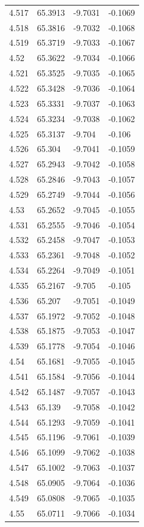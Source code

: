 \begin{tabular}{llll}
4.517 & 65.3913 & -9.7031 & -0.1069 \\
4.518 & 65.3816 & -9.7032 & -0.1068 \\
4.519 & 65.3719 & -9.7033 & -0.1067 \\
4.52 & 65.3622 & -9.7034 & -0.1066 \\
4.521 & 65.3525 & -9.7035 & -0.1065 \\
4.522 & 65.3428 & -9.7036 & -0.1064 \\
4.523 & 65.3331 & -9.7037 & -0.1063 \\
4.524 & 65.3234 & -9.7038 & -0.1062 \\
4.525 & 65.3137 & -9.704 & -0.106 \\
4.526 & 65.304 & -9.7041 & -0.1059 \\
4.527 & 65.2943 & -9.7042 & -0.1058 \\
4.528 & 65.2846 & -9.7043 & -0.1057 \\
4.529 & 65.2749 & -9.7044 & -0.1056 \\
4.53 & 65.2652 & -9.7045 & -0.1055 \\
4.531 & 65.2555 & -9.7046 & -0.1054 \\
4.532 & 65.2458 & -9.7047 & -0.1053 \\
4.533 & 65.2361 & -9.7048 & -0.1052 \\
4.534 & 65.2264 & -9.7049 & -0.1051 \\
4.535 & 65.2167 & -9.705 & -0.105 \\
4.536 & 65.207 & -9.7051 & -0.1049 \\
4.537 & 65.1972 & -9.7052 & -0.1048 \\
4.538 & 65.1875 & -9.7053 & -0.1047 \\
4.539 & 65.1778 & -9.7054 & -0.1046 \\
4.54 & 65.1681 & -9.7055 & -0.1045 \\
4.541 & 65.1584 & -9.7056 & -0.1044 \\
4.542 & 65.1487 & -9.7057 & -0.1043 \\
4.543 & 65.139 & -9.7058 & -0.1042 \\
4.544 & 65.1293 & -9.7059 & -0.1041 \\
4.545 & 65.1196 & -9.7061 & -0.1039 \\
4.546 & 65.1099 & -9.7062 & -0.1038 \\
4.547 & 65.1002 & -9.7063 & -0.1037 \\
4.548 & 65.0905 & -9.7064 & -0.1036 \\
4.549 & 65.0808 & -9.7065 & -0.1035 \\
4.55 & 65.0711 & -9.7066 & -0.1034 \\

\end{tabular}
